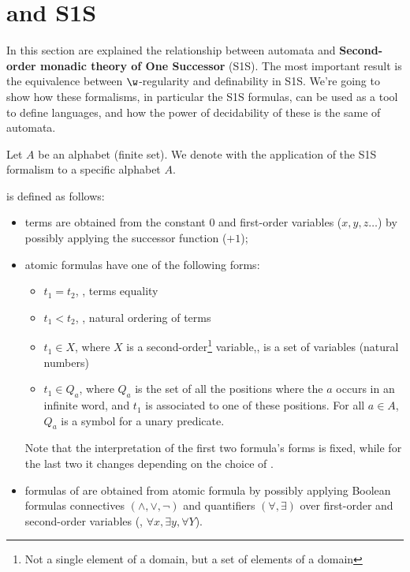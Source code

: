 \documentclass[oneside]{academica}
\begin{document}
\section{\SA and S1S}

In this section are explained the relationship between \Buchi automata and \textbf{Second-order monadic theory of One Successor} (S1S).
The most important result is the equivalence between $\w$-regularity and definability in S1S.
We're going to show how these formalisms, in particular the S1S formulas, can be used as a tool to define languages, and how the power of decidability of these is the same of \Buchi automata.

Let $A$ be an alphabet (finite set).
We denote with \SA the application of the S1S formalism to a specific alphabet $A$.

\begin{definition*}[\SA]
  \SA is defined as follows:
  \begin{itemize}
    \item terms are obtained from the constant 0 and first-order variables ($x,y,z \ldots$) by possibly applying the successor function ($+1$);
    \item atomic formulas have one of the following forms:
      \begin{itemize}
        \item $t_1 = t_2$, \ie, terms equality
        \item $t_1 < t_2$, \ie, natural ordering of terms
        \item $t_1 \in X$, where $X$ is a second-order\footnote{Not a single element of a domain, but a set of elements of a domain} variable,\ie, is a set of variables (natural numbers)
        \item $t_1 \in Q_a$, where $Q_a$ is the set of all the positions where the $a$ occurs in an infinite word, and $t_1$ is associated to one of these positions. For all $a \in A$, $Q_a$ is a symbol for a unary predicate.
      \end{itemize}
      Note that the interpretation of the first two formula's forms is fixed, while for the last two it changes depending on the choice of \wword.
    \item formulas of \SA are obtained from atomic formula by possibly applying Boolean formulas connectives $(\land, \lor, \neg)$ and quantifiers $(\forall, \exists)$ over first-order and second-order variables (\eg, $\forall x, \exists y, \forall Y$).
  \end{itemize}
\end{definition*}
\end{document}
